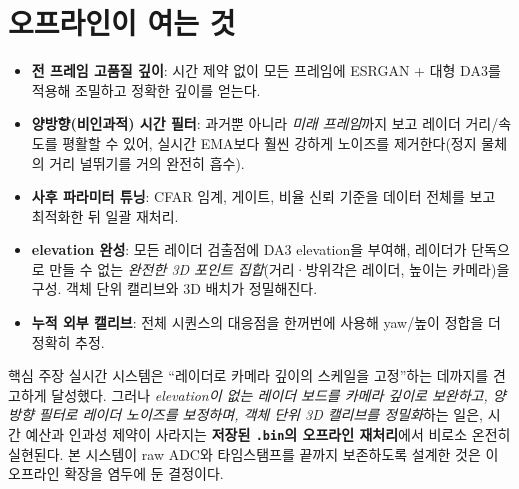 \section{오프라인이 여는 것}
\begin{itemize}
  \item \textbf{전 프레임 고품질 깊이}: 시간 제약 없이 모든 프레임에 ESRGAN +
        대형 DA3를 적용해 조밀하고 정확한 깊이를 얻는다.
  \item \textbf{양방향(비인과적) 시간 필터}: 과거뿐 아니라 \emph{미래 프레임}까지
        보고 레이더 거리/속도를 평활할 수 있어, 실시간 EMA보다 훨씬 강하게
        노이즈를 제거한다(정지 물체의 거리 널뛰기를 거의 완전히 흡수).
  \item \textbf{사후 파라미터 튜닝}: CFAR 임계, 게이트, 비율 신뢰 기준을 데이터
        전체를 보고 최적화한 뒤 일괄 재처리.
  \item \textbf{elevation 완성}: 모든 레이더 검출점에 DA3 elevation을 부여해,
        레이더가 단독으로 만들 수 없는 \emph{완전한 3D 포인트 집합}(거리·방위각은
        레이더, 높이는 카메라)을 구성. 객체 단위 캘리브와 3D 배치가 정밀해진다.
  \item \textbf{누적 외부 캘리브}: 전체 시퀀스의 대응점을 한꺼번에 사용해 yaw/높이
        정합을 더 정확히 추정.
\end{itemize}

\begin{designbox}{핵심 주장}
실시간 시스템은 ``레이더로 카메라 깊이의 스케일을 고정''하는 데까지를 견고하게
달성했다. 그러나 \emph{elevation이 없는 레이더 보드를 카메라 깊이로 보완하고,
양방향 필터로 레이더 노이즈를 보정하며, 객체 단위 3D 캘리브를 정밀화}하는 일은,
시간 예산과 인과성 제약이 사라지는 \textbf{저장된 \texttt{.bin}의 오프라인
재처리}에서 비로소 온전히 실현된다. 본 시스템이 raw ADC와 타임스탬프를 끝까지
보존하도록 설계한 것은 이 오프라인 확장을 염두에 둔 결정이다.
\end{designbox}
